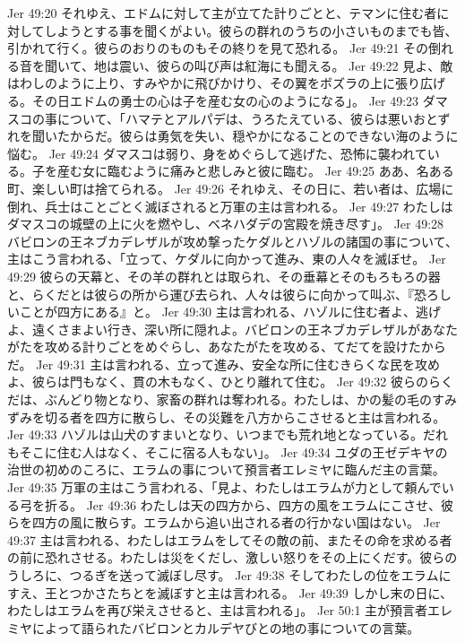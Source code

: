 Jer 49:20  それゆえ、エドムに対して主が立てた計りごとと、テマンに住む者に対してしようとする事を聞くがよい。彼らの群れのうちの小さいものまでも皆、引かれて行く。彼らのおりのものもその終りを見て恐れる。
Jer 49:21  その倒れる音を聞いて、地は震い、彼らの叫び声は紅海にも聞える。
Jer 49:22  見よ、敵はわしのように上り、すみやかに飛びかけり、その翼をボズラの上に張り広げる。その日エドムの勇士の心は子を産む女の心のようになる」。
Jer 49:23  ダマスコの事について、「ハマテとアルパデは、うろたえている、彼らは悪いおとずれを聞いたからだ。彼らは勇気を失い、穏やかになることのできない海のように悩む。
Jer 49:24  ダマスコは弱り、身をめぐらして逃げた、恐怖に襲われている。子を産む女に臨むように痛みと悲しみと彼に臨む。
Jer 49:25  ああ、名ある町、楽しい町は捨てられる。
Jer 49:26  それゆえ、その日に、若い者は、広場に倒れ、兵士はことごとく滅ぼされると万軍の主は言われる。
Jer 49:27  わたしはダマスコの城壁の上に火を燃やし、ベネハダデの宮殿を焼き尽す」。
Jer 49:28  バビロンの王ネブカデレザルが攻め撃ったケダルとハゾルの諸国の事について、主はこう言われる、「立って、ケダルに向かって進み、東の人々を滅ぼせ。
Jer 49:29  彼らの天幕と、その羊の群れとは取られ、その垂幕とそのもろもろの器と、らくだとは彼らの所から運び去られ、人々は彼らに向かって叫ぶ、『恐ろしいことが四方にある』と。
Jer 49:30  主は言われる、ハゾルに住む者よ、逃げよ、遠くさまよい行き、深い所に隠れよ。バビロンの王ネブカデレザルがあなたがたを攻める計りごとをめぐらし、あなたがたを攻める、てだてを設けたからだ。
Jer 49:31  主は言われる、立って進み、安全な所に住むきらくな民を攻めよ、彼らは門もなく、貫の木もなく、ひとり離れて住む。
Jer 49:32  彼らのらくだは、ぶんどり物となり、家畜の群れは奪われる。わたしは、かの髪の毛のすみずみを切る者を四方に散らし、その災難を八方からこさせると主は言われる。
Jer 49:33  ハゾルは山犬のすまいとなり、いつまでも荒れ地となっている。だれもそこに住む人はなく、そこに宿る人もない」。
Jer 49:34  ユダの王ゼデキヤの治世の初めのころに、エラムの事について預言者エレミヤに臨んだ主の言葉。
Jer 49:35  万軍の主はこう言われる、「見よ、わたしはエラムが力として頼んでいる弓を折る。
Jer 49:36  わたしは天の四方から、四方の風をエラムにこさせ、彼らを四方の風に散らす。エラムから追い出される者の行かない国はない。
Jer 49:37  主は言われる、わたしはエラムをしてその敵の前、またその命を求める者の前に恐れさせる。わたしは災をくだし、激しい怒りをその上にくだす。彼らのうしろに、つるぎを送って滅ぼし尽す。
Jer 49:38  そしてわたしの位をエラムにすえ、王とつかさたちとを滅ぼすと主は言われる。
Jer 49:39  しかし末の日に、わたしはエラムを再び栄えさせると、主は言われる」。
Jer 50:1  主が預言者エレミヤによって語られたバビロンとカルデヤびとの地の事についての言葉。

